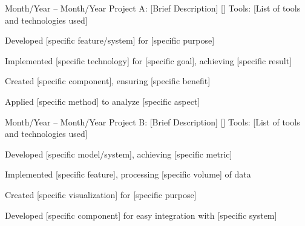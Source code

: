 \begin{resumeSubEvent}
  {Month/Year -- Month/Year}
  {Project A: [Brief Description] [\href{https://github.com/your-username/project-a}{\faGithub}]}
  {Tools: [List of tools and technologies used]}
  {%
  \begin{resumeItemList}
    \item Developed [specific feature/system] for [specific purpose]
    \item Implemented [specific technology] for [specific goal], achieving [specific result]
    \item Created [specific component], ensuring [specific benefit]
    \item Applied [specific method] to analyze [specific aspect]
  \end{resumeItemList}
  }%
\end{resumeSubEvent}

\begin{resumeSubEvent}
  {Month/Year -- Month/Year}
  {Project B: [Brief Description] [\href{https://github.com/your-username/project-b}{\faGithub}]}
  {Tools: [List of tools and technologies used]}
  {%
  \begin{resumeItemList}
    \item Developed [specific model/system], achieving [specific metric]
    \item Implemented [specific feature], processing [specific volume] of data
    \item Created [specific visualization] for [specific purpose]
    \item Developed [specific component] for easy integration with [specific system]
  \end{resumeItemList}
  }%
\end{resumeSubEvent}